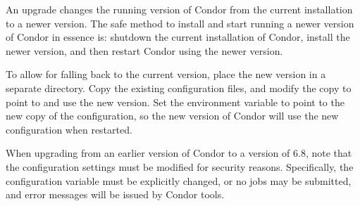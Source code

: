 An upgrade changes the running version of Condor 
from the current installation to a newer version.
The safe method 
to install and start running a newer version of Condor 
in essence is:
shutdown the current installation of Condor,
install the newer version,
and then restart Condor using the newer version.

To allow for falling back to the current version,
place the new version in a separate directory.
Copy the existing configuration files,
and modify the copy to point to and use the new version.
Set the  environment variable
to point to the new copy of the configuration,
so the new version of Condor will use the new configuration
when restarted.

When upgrading from an earlier version of Condor to a version of 6.8,
note that the configuration settings must be modified for security reasons. 
Specifically, the  configuration variable
must be explicitly changed,
or no jobs may be submitted,
and error messages will be issued by Condor tools.




